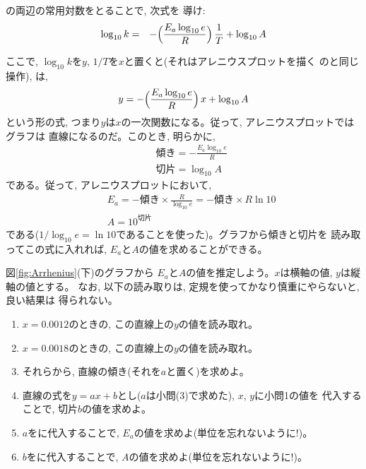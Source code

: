 \begin{q}\label{q:k_Arrhenius_log1} の両辺の常用対数をとることで, 次式を
導け:
\begin{eqnarray}
\log_{10}k&=&-\Bigl(\frac{E_a\log_{10}e}{R}\Bigr)\,\frac{1}{T}+\log_{10}A\label{eq:k_Arrhenius_log}
\end{eqnarray}\end{q}
\mv

ここで, $\log_{10}k$を$y$, $1/T$を$x$と置くと(それはアレニウスプロットを描く
のと同じ操作), は, 
\begin{eqnarray}
y=-\Bigl(\frac{E_a\log_{10}e}{R}\Bigr)\,x+\log_{10}A\label{eq:k_Arrhenius_log3}
\end{eqnarray}
という形の式, つまり$y$は$x$の一次関数になる。従って, アレニウスプロットではグラフは
直線になるのだ。このとき, 明らかに, 
\begin{eqnarray}
&&\text{傾き}=-\frac{E_a\log_{10}e}{R}\\
&&\text{切片}=\log_{10}A
\end{eqnarray}
である。従って, アレニウスプロットにおいて, 
\begin{eqnarray}
&&E_a=-\text{傾き}\times\frac{R}{\log_{10}e}=-\text{傾き}\times R\ln 10\label{eq:Arrhenius_E_a}\\
&&A=10^{\text{切片}}\label{eq:Arrhenius_A}
\end{eqnarray}
である($1/\log_{10}e=\ln 10$であることを使った)。グラフから傾きと切片を
読み取ってこの式に入れれば, $E_a$と$A$の値を求めることができる。


\begin{q}\label{q:k_Arrhenius_log3} 図\ref{fig:Arrhenius}(下)のグラフから
$E_a$と$A$の値を推定しよう。$x$は横軸の値, $y$は縦軸の値とする。
なお, 以下の読み取りは, 定規を使ってかなり慎重にやらないと, 良い結果は
得られない。
\begin{enumerate}
\item $x=0.0012$のときの, この直線上の$y$の値を読み取れ。
\item $x=0.0018$のときの, この直線上の$y$の値を読み取れ。
\item それらから, 直線の傾き(それを$a$と置く)を求めよ。
\item 直線の式を$y=ax+b$とし($a$は小問(3)で求めた), $x$, $y$に小問1の値を
代入することで, 切片$b$の値を求めよ。
\item $a$をに代入することで, $E_a$の値を求めよ(単位を忘れないように!)。
\item $b$をに代入することで, $A$の値を求めよ(単位を忘れないように!)。
\end{enumerate}
\end{q}

